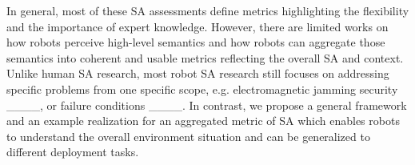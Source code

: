 In general, most of these SA assessments define metrics highlighting the flexibility and the importance of expert knowledge. However, there are limited works on how robots perceive high-level semantics and how robots can aggregate those semantics into coherent and usable metrics reflecting the overall SA and context. Unlike human SA research, most robot SA research still focuses on addressing specific problems from one specific scope, e.g. electromagnetic jamming security ____, or failure conditions ____. In contrast, we propose a general framework and an example realization for an aggregated metric of SA which enables robots to understand the overall environment situation and can be generalized to different deployment tasks.